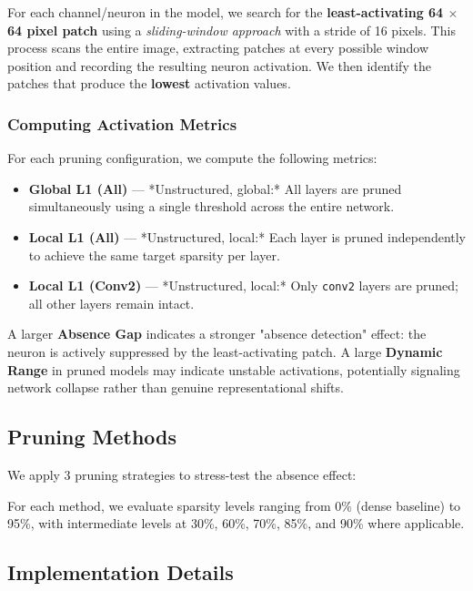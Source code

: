 For each channel/neuron in the model, we search for the \textbf{least-activating 64 \(\times\) 64  pixel patch} using a \textit{sliding-window approach} with a stride of 16 pixels. This process scans the entire image, extracting patches at every possible window position and recording the resulting neuron activation. We then identify the patches that produce the \textbf{lowest} activation values.

\subsubsection{\textbf{Computing Activation Metrics}}

For each pruning configuration, we compute the following metrics:

\begin{itemize}
\item \textbf{Global L1  (All)} — *Unstructured, global:* All layers are pruned simultaneously using a single threshold across the entire network.
\item \textbf{Local L1  (All)} — *Unstructured, local:* Each layer is pruned independently to achieve the same target sparsity per layer.
\item \textbf{Local L1  (Conv2)} — *Unstructured, local:* Only \texttt{conv2} layers are pruned; all other layers remain intact.
\end{itemize}

A larger \textbf{Absence Gap} indicates a stronger "absence detection" effect: the neuron is actively suppressed by the least-activating patch. A large \textbf{Dynamic Range} in pruned models may indicate unstable activations, potentially signaling network collapse rather than genuine representational shifts.

\subsection{\textbf{Pruning Methods}}

We apply 3 pruning strategies to stress-test the absence effect:

For each method, we evaluate sparsity levels ranging from 0\% (dense baseline) to 95\%, with intermediate levels at 30\%, 60\%, 70\%, 85\%, and 90\% where applicable.

\subsection{\textbf{Implementation Details}}

